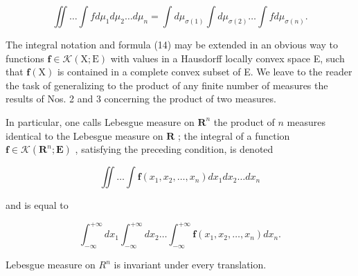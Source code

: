 \[
\iint \dots \int f d \mu_ {1} d \mu_ {2} \dots d \mu_ {n} = \int d \mu_ {\sigma (1)} \int d \mu_ {\sigma (2)} \dots \int f d \mu_ {\sigma (n)}.\tag{14}
\]

The integral notation and formula (14) may be extended in an obvious way to functions \(\mathbf{f} \in \mathcal{K}(\mathrm{X};\mathrm{E})\) with values in a Hausdorff locally convex space E, such that \(\mathbf{f}(\mathrm{X})\) is contained in a complete convex subset of E. We leave to the reader the task of generalizing to the product of any finite number of measures the results of Nos. 2 and 3 concerning the product of two measures.

In particular, one calls Lebesgue measure on \(\mathbf{R}^n\) the product of \(n\) measures identical to the Lebesgue measure on \(\mathbf{R}\) ; the integral of a function \(\mathbf{f} \in \mathcal{K}(\mathbf{R}^n; \mathbf{E})\) , satisfying the preceding condition, is denoted

\[
\iint \dots \int \mathbf {f} (x _ {1}, x _ {2}, \dots , x _ {n}) d x _ {1} d x _ {2} \dots d x _ {n}
\]

and is equal to

\[
\int_ {- \infty} ^ {+ \infty} d x _ {1} \int_ {- \infty} ^ {+ \infty} d x _ {2} \dots \int_ {- \infty} ^ {+ \infty} \mathbf {f} (x _ {1}, x _ {2}, \dots , x _ {n}) d x _ {n}.
\]

Lebesgue measure on \(R^{n}\) is invariant under every translation.
